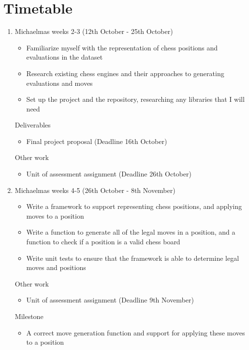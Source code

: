\documentclass[12pt,a4paper]{article}
\begin{document}
\section*{Timetable}
\begin{enumerate}
    \item Michaelmas weeks 2-3 (12th October - 25th October)
    \begin{itemize}
        \item Familiarize myself with the representation of chess positions and evaluations in the dataset
        \item Research existing chess engines and their approaches to generating evaluations and moves
        \item Set up the project and the repository, researching any libraries that I will need
    \end{itemize}
    Deliverables
    \begin{itemize}
        \item Final project proposal (Deadline 16th October)
    \end{itemize}
    Other work
    \begin{itemize}
        \item Unit of assessment assignment (Deadline 26th October)
    \end{itemize}

    \item Michaelmas weeks 4-5 (26th October - 8th November)
    \begin{itemize}
        \item Write a framework to support representing chess positions, and applying moves to a position
        \item Write a function to generate all of the legal moves in a position, and a function to check if a position is a valid chess board
        \item Write unit tests to ensure that the framework is able to determine legal moves and positions
    \end{itemize}
    Other work
    \begin{itemize}
        \item Unit of assessment assignment (Deadline 9th November)
    \end{itemize}
    Milestone
    \begin{itemize}
        \item A correct move generation function and support for applying these moves to a position
    \end{itemize}


\end{enumerate}
\end{document}
